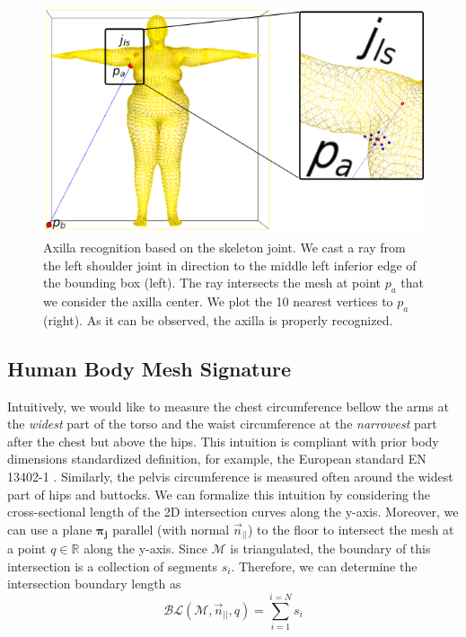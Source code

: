 \documentclass[runningheads, orivec]{llncs}
\begin{document}
\begin{figure}[H]
	\begin{center}
		\includegraphics[width=\linewidth]{axilla_recognition_final.png}
	\end{center}
	\caption{Axilla recognition based on the skeleton joint. We cast a ray from 
	the left shoulder joint in direction to the middle left 
		inferior edge of the bounding box (left). The ray intersects the mesh 
		at point $p_a$ that we consider the axilla center. We plot the 10 
		nearest vertices to $p_a$ (right). As it can be observed, the axilla is 
		properly recognized.}
	\label{fig:axilla-recognition}
\end{figure}

\subsection{Human Body Mesh Signature}\label{subsec:hbm_signature}
Intuitively, we would like to measure the chest circumference bellow the arms 
at the \textit{widest} part of the torso and the waist circumference at the 
\textit{narrowest} part after the chest but above the hips. This intuition is 
compliant 
with prior body dimensions standardized definition, for example, the European 
standard EN 13402-1 \cite{en13402-1}. Similarly, the pelvis 
circumference is measured often around the widest part of hips and 
buttocks. We 
can formalize this intuition by considering the cross-sectional length of the 
2D intersection curves\cite{book.compu.topo} along the y-axis. Moreover, we 
can 
use a plane $\boldsymbol{\pi_j}$ parallel (with normal $\vec{n}_{||}$) to the 
floor to intersect the mesh at a point $q \in 
\mathbb{R}$ along the y-axis. Since $\mathcal{M}$ is triangulated, the boundary 
of this 
intersection is a collection of segments $s_i$. Therefore, we can 
determine the intersection boundary length as
\begin{equation}
\mathcal{BL}(\mathcal{M}, \vec{n}_{||}, q) = \sum_{i = 
	1}^{i = N}s_i
\end{equation}
\end{document}
